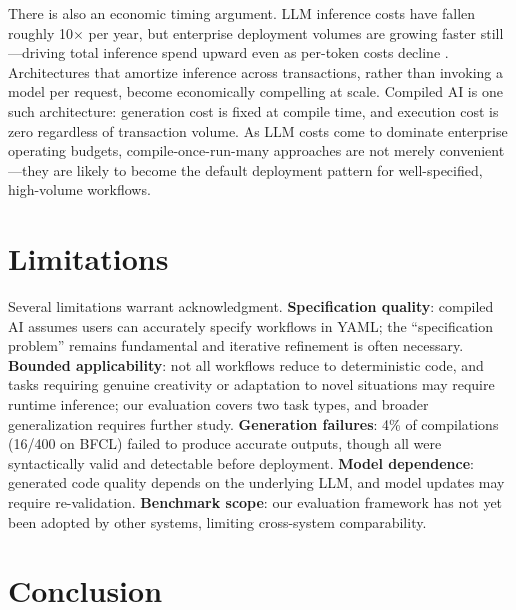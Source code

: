\documentclass[11pt]{article}
\begin{document}
There is also an economic timing argument. LLM inference costs have fallen roughly 10$\times$ per year, but enterprise deployment volumes are growing faster still---driving total inference spend upward even as per-token costs decline \citep{openai2026pricing}. Architectures that amortize inference across transactions, rather than invoking a model per request, become economically compelling at scale. Compiled AI is one such architecture: generation cost is fixed at compile time, and execution cost is zero regardless of transaction volume. As LLM costs come to dominate enterprise operating budgets, compile-once-run-many approaches are not merely convenient---they are likely to become the default deployment pattern for well-specified, high-volume workflows.

\section{Limitations}
\label{sec:limitations}

Several limitations warrant acknowledgment. \textbf{Specification quality}: compiled AI assumes users can accurately specify workflows in YAML; the ``specification problem'' remains fundamental and iterative refinement is often necessary. \textbf{Bounded applicability}: not all workflows reduce to deterministic code, and tasks requiring genuine creativity or adaptation to novel situations may require runtime inference; our evaluation covers two task types, and broader generalization requires further study. \textbf{Generation failures}: 4\% of compilations (16/400 on BFCL) failed to produce accurate outputs, though all were syntactically valid and detectable before deployment. \textbf{Model dependence}: generated code quality depends on the underlying LLM, and model updates may require re-validation. \textbf{Benchmark scope}: our evaluation framework has not yet been adopted by other systems, limiting cross-system comparability.

\section{Conclusion}
\label{sec:conclusion}
\end{document}
